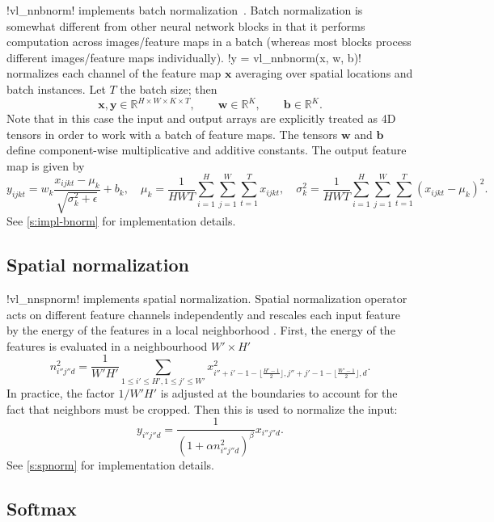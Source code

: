 !vl_nnbnorm! implements batch normalization~\cite{ioffe2015}. Batch normalization is somewhat different from other neural network blocks in that it performs computation across images/feature maps in a batch (whereas most blocks process different images/feature maps individually). !y = vl_nnbnorm(x, w, b)! normalizes each channel of the feature map $\mathbf{x}$ averaging over spatial locations and batch instances. Let $T$ the batch size; then
\[
\mathbf{x}, \mathbf{y} \in \mathbb{R}^{H \times W \times K \times T},
\qquad\mathbf{w} \in \mathbb{R}^{K},
\qquad\mathbf{b} \in \mathbb{R}^{K}.
\]
Note that in this case the input and output arrays are explicitly treated as 4D tensors in order to work with a batch of feature maps. The tensors  $\mathbf{w}$ and $\mathbf{b}$ define component-wise multiplicative and additive constants. The output feature map is given by
\[
y_{ijkt} = w_k \frac{x_{ijkt} - \mu_{k}}{\sqrt{\sigma_k^2 + \epsilon}} + b_k,
\quad
\mu_{k} = \frac{1}{HWT}\sum_{i=1}^H \sum_{j=1}^W \sum_{t=1}^{T} x_{ijkt},
\quad
\sigma^2_{k} = \frac{1}{HWT}\sum_{i=1}^H \sum_{j=1}^W \sum_{t=1}^{T} (x_{ijkt} - \mu_{k})^2.
\]
See \autoref{s:impl-bnorm} for implementation details.

\subsection{Spatial normalization}\label{s:spnorm}

!vl_nnspnorm! implements spatial normalization. Spatial normalization operator acts on different feature channels independently and rescales each input feature by the energy of the features in a local neighborhood . First, the energy of the features is evaluated in a neighbourhood $W'\times H'$
\[
n_{i''j''d}^2 = \frac{1}{W'H'}
\sum_{1\leq i' \leq H', 1 \leq j' \leq W'} x^2_{
i''+i'-1-\lfloor \frac{H'-1}{2}\rfloor,
j''+j'-1-\lfloor \frac{W'-1}{2}\rfloor,
d}.
\]
In practice, the factor $1/W'H'$ is adjusted at the boundaries to account for the fact that neighbors must be cropped. Then this is used to normalize the input:
\[
y_{i''j''d} = \frac{1}{(1 + \alpha n_{i''j''d}^2)^\beta} x_{i''j''d}.
\]
See \autoref{s:spnorm} for implementation details.

\subsection{Softmax}\label{s:softmax}

